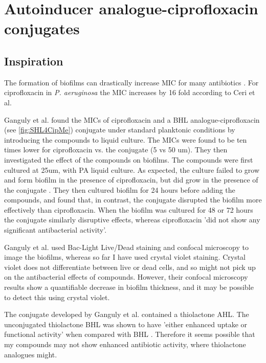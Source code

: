 \section{Autoinducer analogue-ciprofloxacin conjugates}

\subsection{Inspiration}

The formation of biofilms can drastically increase MIC for many antibiotics \cite{Ceri1999}. For ciprofloxacin in \textit{P. aeruginosa} the MIC increases by 16 fold according to Ceri et al. 

Ganguly et al. \cite{Ganguly2011} found the MICs of ciprofloxacin and a BHL analogue-ciprofloxacin  (see \ref{fig:SHL4CipMe}) conjugate under standard planktonic conditions by introducing the compounds to liquid culture. The MICs were found to be ten times lower for ciprofloxacin vs. the conjugate  (5 vs 50 um). They then investigated the effect of the compounds on biofilms. The compounds were first cultured at 25um, with PA liquid culture. As expected, the culture failed to grow and form biofilm in the presence of ciprofloxacin, but did grow in the presence of the conjugate . They then cultured biofilm for 24 hours before adding the compounds, and found that, in contrast, the conjugate  disrupted the biofilm more effectively than ciprofloxacin. When the biofilm was cultured for 48 or 72 hours the conjugate similarly disruptive effects, whereas ciprofloxacin 'did not show any significant antibacterial activity'.

Ganguly et al. used Bac-Light Live/Dead staining and confocal microscopy to image the biofilms, whereas so far I have used crystal violet staining. Crystal violet does not differentiate between live or dead cells, and so might not pick up on the antibacterial effects of compounds. However, their confocal microscopy results show a quantifiable decrease in biofilm thickness, and it may be possible to detect this using crystal violet.

The conjugate  developed by Ganguly et al. contained a thiolactone AHL. The unconjugated thiolactone BHL  was shown to have 'either enhanced uptake or functional activity' when compared with BHL . Therefore it seems possible that my compounds may not show enhanced antibiotic activity, where thiolactone analogues might.

